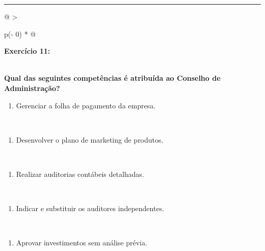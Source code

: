 \documentclass[
]{book}
\providecommand{\tightlist}{%
  \setlength{\itemsep}{0pt}\setlength{\parskip}{0pt}}
\begin{document}
\begin{center}\rule{0.5\linewidth}{0.5pt}\end{center}

\begin{longtable}[]{@{}
  >{\raggedright\arraybackslash}p{(\columnwidth - 0\tabcolsep) * }@{}}
\toprule\noalign{}
\begin{minipage}[b]{\linewidth}\raggedright
\textbf{Exercício 11:}
\end{minipage} \\
\midrule\noalign{}
\endhead
\bottomrule\noalign{}
\endlastfoot
\textbf{Qual das seguintes competências é atribuída ao Conselho de Administração?} \\
\begin{minipage}[t]{\linewidth}\raggedright
\begin{enumerate}
\def\labelenumi{\alph{enumi})}
\tightlist
\item
  Gerenciar a folha de pagamento da empresa.
\end{enumerate}
\end{minipage} \\
\begin{minipage}[t]{\linewidth}\raggedright
\begin{enumerate}
\def\labelenumi{\alph{enumi})}
\setcounter{enumi}{1}
\tightlist
\item
  Desenvolver o plano de marketing de produtos.
\end{enumerate}
\end{minipage} \\
\begin{minipage}[t]{\linewidth}\raggedright
\begin{enumerate}
\def\labelenumi{\alph{enumi})}
\setcounter{enumi}{2}
\tightlist
\item
  Realizar auditorias contábeis detalhadas.
\end{enumerate}
\end{minipage} \\
\begin{minipage}[t]{\linewidth}\raggedright
\begin{enumerate}
\def\labelenumi{\alph{enumi})}
\setcounter{enumi}{3}
\tightlist
\item
  Indicar e substituir os auditores independentes.
\end{enumerate}
\end{minipage} \\
\begin{minipage}[t]{\linewidth}\raggedright
\begin{enumerate}
\def\labelenumi{\alph{enumi})}
\setcounter{enumi}{4}
\tightlist
\item
  Aprovar investimentos sem análise prévia.
\end{enumerate}
\end{minipage} \\
\end{longtable}
\end{document}
